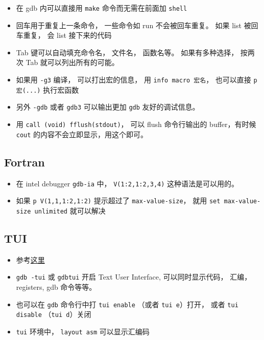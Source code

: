 \begin{itemize}
\item 在 gdb 内可以直接用 \verb`make` 命令而无需在前面加 \verb`shell`
\item 回车用于重复上一条命令， 一些命令如 run 不会被回车重复。 如果 list 被回车重复， 会 list 接下来的代码
\item Tab 键可以自动填充命令名， 文件名， 函数名等。 如果有多种选择， 按两次 Tab 就可以列出所有的可能。
\item 如果用 \verb|-g3| 编译， 可以打出宏的信息， 用 \verb|info macro 宏名|， 也可以直接 \verb|p 宏(...)| 执行宏函数
\item 另外 \verb|-gdb| 或者 \verb|gdb3| 可以输出更加 \verb|gdb| 友好的调试信息。
\item 用 \verb|call (void) fflush(stdout)|， 可以 flush 命令行输出的 buffer，有时候 \verb|cout| 的内容不会立即显示，用这个即可。
\end{itemize}

\subsection{Fortran}
\begin{itemize}
\item 在 intel debugger \verb`gdb-ia` 中， \verb`V(1:2,1:2,3,4)` 这种语法是可以用的。
\item 如果 \verb`p V(1,1,1:2,1:2)` 提示超过了 \verb`max-value-size`， 就用 \verb`set max-value-size unlimited` 就可以解决
\end{itemize}

\subsection{TUI}
\begin{itemize}
\item 参考\href{https://developer.apple.com/library/archive/documentation/DeveloperTools/gdb/gdb/gdb_toc.html#TOC229}{这里}
\item \verb`gdb -tui` 或 \verb`gdbtui` 开启 Text User Interface, 可以同时显示代码， 汇编， registers, gdb 命令等等。
\item 也可以在 \verb|gdb| 命令行中打 \verb|tui enable| （或者 \verb|tui e|）打开， 或者 \verb|tui disable| （\verb|tui d|）关闭
\item \verb|tui| 环境中， \verb|layout asm| 可以显示汇编码
\end{itemize}


